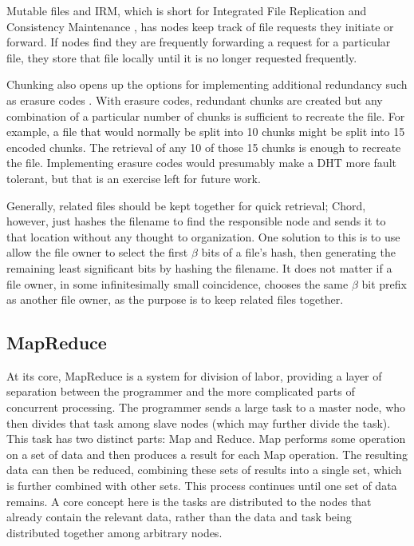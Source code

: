 Mutable files and IRM, which is short for Integrated File Replication and Consistency Maintenance \cite{irm}, has nodes keep track of file requests they initiate or forward.  
If nodes find they are frequently forwarding a request for a particular file, they store that file locally until it is no longer requested frequently.  

Chunking also opens up the options for implementing additional redundancy such as erasure codes \cite{rizzo1997effective}. 
With erasure codes, redundant chunks are created but any combination of a particular number of chunks is sufficient to recreate the file.  
For example, a file that would normally be split into 10 chunks might be split into 15 encoded chunks.  The retrieval of any 10 of those 15 chunks is enough to recreate the file.  
Implementing erasure codes would presumably make a DHT more fault tolerant, but that is an exercise left for future work.


Generally, related files should be kept together for quick retrieval; Chord, however, just hashes the filename to find the responsible node and sends it to that location without any thought to organization.  
One solution to this is to use allow the file owner to select the first $ \beta $ bits of a file's hash, then generating the remaining least significant bits by hashing the filename.  
It does not matter if a file owner, in some infinitesimally small coincidence, chooses the same $ \beta $ bit prefix as another file owner, as the purpose is to keep related files together.   


\subsection{MapReduce}
At its core, MapReduce \cite{mapreduce} is a system for division of labor, providing a layer of separation between the programmer and the more complicated parts of concurrent processing.
The programmer sends a large task to a master node, who then divides that task among slave nodes (which may further divide the task).  This task has two distinct parts: Map and Reduce.  
Map performs some operation on a set of data and then produces a result for each Map operation.  
The resulting data can then be reduced, combining these sets of results into a single set, which is further combined with other sets.
This process continues until one set of data remains.
A core concept here is the tasks are distributed to the nodes that already contain the relevant data, rather than the data and task being distributed together among arbitrary nodes.

